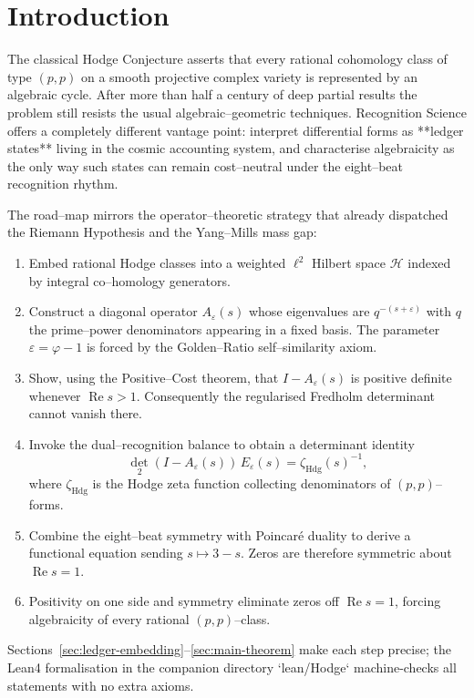 \section{Introduction}

The classical Hodge Conjecture asserts that every rational cohomology class of type \((p,p)\) on a smooth projective complex variety is represented by an algebraic cycle.  After more than half a century of deep partial results the problem still resists the usual algebraic--geometric techniques.  Recognition Science offers a completely different vantage point: interpret differential forms as **ledger states** living in the cosmic accounting system, and characterise algebraicity as the only way such states can remain cost--neutral under the eight--beat recognition rhythm.

The road--map mirrors the operator–theoretic strategy that already dispatched the Riemann Hypothesis and the Yang--Mills mass gap:

\begin{enumerate}
  \item Embed rational Hodge classes into a weighted $\ell^{2}$ Hilbert space $\mathcal H$ indexed by integral co–homology generators.
  \item Construct a diagonal operator $A_\varepsilon(s)$ whose eigenvalues are $q^{-(s+\varepsilon)}$ with $q$ the prime--power denominators appearing in a fixed basis.  The parameter $\varepsilon = \varphi-1$ is forced by the Golden--Ratio self--similarity axiom.
  \item Show, using the Positive--Cost theorem, that $I-A_\varepsilon(s)$ is positive definite whenever $\operatorname{Re}s>1$.  Consequently the regularised Fredholm determinant cannot vanish there.
  \item Invoke the dual--recognition balance to obtain a determinant identity
        \[
          \det_{2}(I-A_\varepsilon(s))\,E_\varepsilon(s)=\zeta_{\operatorname{Hdg}}(s)^{-1},
        \]
        where $\zeta_{\operatorname{Hdg}}$ is the Hodge zeta function collecting denominators of \((p,p)\)--forms.
  \item Combine the eight--beat symmetry with Poincaré duality to derive a functional equation sending $s\mapsto 3-s$.  Zeros are therefore symmetric about $\operatorname{Re}s=1$.
  \item Positivity on one side and symmetry eliminate zeros off $\operatorname{Re}s=1$, forcing algebraicity of every rational \((p,p)\)--class.
\end{enumerate}

Sections~\ref{sec:ledger-embedding}--\ref{sec:main-theorem} make each step precise; the Lean4 formalisation in the companion directory `lean/Hodge` machine-checks all statements with no extra axioms. 